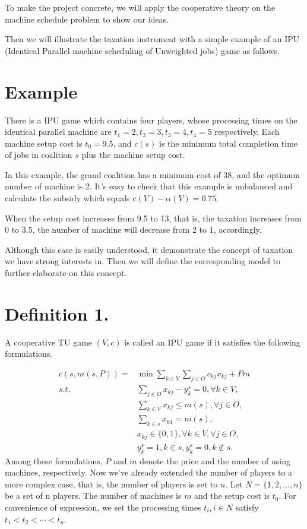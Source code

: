 \documentclass[UTF8]{article}
\begin{document}
To make the project concrete, we will apply the cooperative theory on the machine schedule problem to show our ideas.


Then we will illustrate the taxation instrument with a simple example of an IPU (Identical Parallel machine scheduling of Unweighted jobs) game as follows.

\section*{Example}

There is a IPU game which contains four players, whose processing times on the identical parallel machine are $t_1=2,t_2=3,t_3=4,t_4=5$ respectively. Each machine setup cost is $t_0=9.5$, and $c(s)$ is the minimum total completion time of jobs in coalition $s$ plus the machine setup cost.

In this example, the grand coalition has a minimum cost of 38, and the optimum number of machine is 2.
It's easy to check that this example is unbalanced and calculate the subsidy which equals $ c(V) - \alpha(V) = 0.75$.

When the setup cost increases from 9.5 to 13, that is, the taxation increases from 0 to 3.5,
the number of machine will decrease from 2 to 1, accordingly.

Although this case is easily understood, it demonstrate the concept of taxation we have strong interests in. Then we will define the corresponding model to further elaborate on this concept.

\section*{Definition 1.}

A cooperative TU game $(V,c)$ is called an IPU game if it satisfies the following formulations.

\[
\begin{aligned}
c(s,m(s,P)) = & {\min} \sum_{k\in V}\sum_{j\in O} {c_{kj} x_{kj}} + { Pm} \\
{s.t.}\quad & \sum_{j \in O} x_{kj}-y_k^s=0, \forall k \in V, \\
& \sum_{k\in V} x_{kj} \leq m(s),\forall j \in O,  \\
& \sum_{k\in s} x_{k1}=m(s), \\
& x_{kj} \in \{0,1\} , \forall k \in V, \forall j \in O,\\
& y_k^s=1, k \in s, y_k^s=0, k \notin s.
\end{aligned}
\]
Among these formulations, $P$ and $m$ denote the price and the number of using machines, respectively.
Now we've already extended the number of players to a more complex case, that is, the number of players is set to $n$.
Let $N=\{1,2,\ldots,n\}$ be a set of n players. The number of machines is $m$ and the setup cost is $t_0$.
For convenience of expression, we set the processing times $t_i, i\in N$ satisfy $t_1<t_2<\cdots<t_n$.
\end{document}
